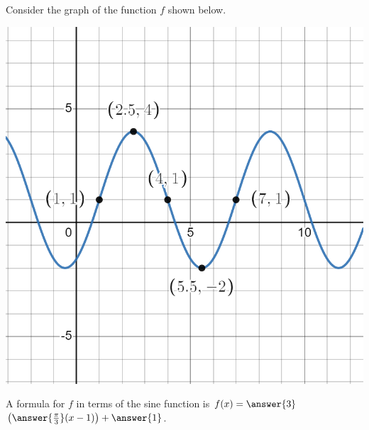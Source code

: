 \documentclass{ximera}
\begin{document}
\begin{exercise}
Consider the graph of the function $f$ shown below. 

\begin{image}
\includegraphics[width=0.8\linewidth]{TF9-graph-3.png}
\end{image}

A formula for $f$ in terms of the sine function is $f(x) = \answer{3}$\wordChoice{\choice[correct]{$\sin$}\choice{$\cos$}}$\left(\answer{\frac{\pi}{3}}(x - 1)\right) + \answer{1}$. 
\end{exercise} 
\end{document}
